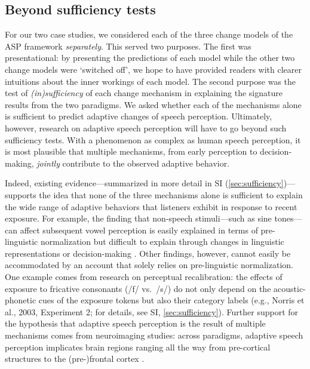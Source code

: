 \documentclass[
  11pt,
  man,floatsintext]{apa6}
\begin{document}
\subsection{Beyond sufficiency tests}\label{beyond-sufficiency-tests}

For our two case studies, we considered each of the three change models of the ASP framework \emph{separately}. This served two purposes. The first was presentational: by presenting the predictions of each model while the other two change models were `switched off', we hope to have provided readers with clearer intuitions about the inner workings of each model. The second purpose was the test of \emph{(in)sufficiency} of each change mechanism in explaining the signature results from the two paradigms. We asked whether each of the mechanisms alone is sufficient to predict adaptive changes of speech perception. Ultimately, however, research on adaptive speech perception will have to go beyond such sufficiency tests. With a phenomenon as complex as human speech perception, it is most plausible that multiple mechanisms, from early perception to decision-making, \emph{jointly} contribute to the observed adaptive behavior.

Indeed, existing evidence---summarized in more detail in SI (\ref{sec:sufficiency})---supports the idea that none of the three mechanisms alone is sufficient to explain the wide range of adaptive behaviors that listeners exhibit in response to recent exposure. For example, the finding that non-speech stimuli---such as sine tones---can affect subsequent vowel perception \autocites[e.g.,][]{holt2001,holt2006,huang-holt2011} is easily explained in terms of pre-linguistic normalization but difficult to explain through changes in linguistic representations or decision-making \autocite[see also][]{chodroff-wilson2020}. Other findings, however, cannot easily be accommodated by an account that solely relies on pre-linguistic normalization. One example comes from research on perceptual recalibration: the effects of exposure to fricative consonants (/f/ vs.~/s/) do not only depend on the acoustic-phonetic cues of the exposure tokens but also their category labels (e.g., Norris et al., 2003, Experiment 2; for details, see SI, \ref{sec:sufficiency}). Further support for the hypothesis that adaptive speech perception is the result of multiple mechanisms comes from neuroimaging studies: across paradigms, adaptive speech perception implicates brain regions ranging all the way from pre-cortical structures \autocites[e.g., in the brain stem,][]{chandrasekaran2009,polonenko2021,zhao2018} to the (pre-)frontal cortex \autocite{hickok-poeppel2007,blanco-elorriera2021,defenderfer2021}.
\end{document}
